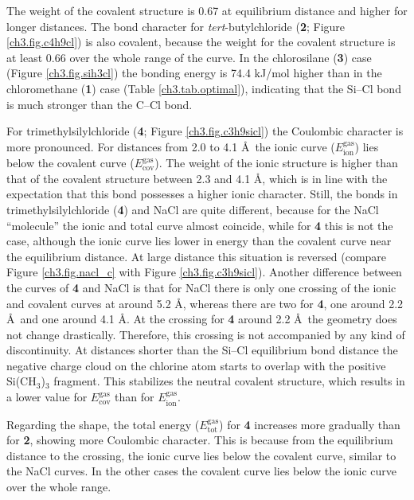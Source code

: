 The weight of the covalent structure is 0.67 at equilibrium distance and higher for longer distances. The bond character for \textit{tert}-butylchloride (\textbf{2}; Figure \ref{ch3.fig.c4h9cl}) is also covalent, because the weight for the covalent structure is at least 0.66 over the whole range of the curve.
In the chlorosilane (\textbf{3}) case (Figure \ref{ch3.fig.sih3cl}) the bonding energy is 74.4 kJ/mol higher than in the chloromethane (\textbf{1}) case (Table \ref{ch3.tab.optimal}), indicating that the Si--Cl bond is much stronger than the C--Cl bond. 

For trimethylsilylchloride (\textbf{4}; Figure \ref{ch3.fig.c3h9sicl}) the Coulombic character is more pronounced. For distances from 2.0 to 4.1 \AA\  the ionic curve ($E_\mathrm{ion}^\mathrm{gas}$) lies below the covalent curve ($E_\mathrm{cov}^\mathrm{gas}$). The weight of the ionic structure is higher than that of the covalent structure between 2.3 and 4.1 \AA, which is in line with the expectation that this bond possesses a higher ionic character. Still, the bonds in trimethylsilylchloride (\textbf{4}) and NaCl are quite different, because for the NaCl ``molecule'' the ionic and total curve almost coincide, while for \textbf{4} this is not the case, although the ionic curve lies lower in energy than the covalent curve near the equilibrium distance. At large distance this situation is reversed (compare Figure \ref{ch3.fig.nacl_c} with Figure \ref{ch3.fig.c3h9sicl}). Another difference between the curves of \textbf{4} and NaCl is that for NaCl there is only one crossing of the ionic and covalent curves at around 5.2 \AA, whereas there are two for \textbf{4}, one around 2.2 \AA\ and one around 4.1 \AA. At the crossing for \textbf{4} around 2.2 \AA\ the geometry does not change drastically. Therefore, this crossing is not accompanied by any kind of discontinuity. At distances shorter than the Si--Cl equilibrium bond distance the negative charge cloud on the chlorine atom starts to overlap with the positive Si(CH$_3$)$_3$ fragment. This stabilizes the neutral covalent structure, which results in a lower value for $E_\mathrm{cov}^\mathrm{gas}$ than for $E_\mathrm{ion}^\mathrm{gas}$. 

Regarding the shape, the total energy ($E_\mathrm{tot}^\mathrm{gas}$) for \textbf{4} increases more gradually than for \textbf{2}, showing more Coulombic character. This is because from the equilibrium distance to the crossing, the ionic curve lies below the covalent curve, similar to the NaCl curves. In the other cases the covalent curve lies below the ionic curve over the whole range.

